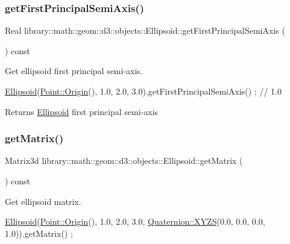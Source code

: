 \subsubsection{\texorpdfstring{get\+First\+Principal\+Semi\+Axis()}{getFirstPrincipalSemiAxis()}}
{\footnotesize\ttfamily Real library\+::math\+::geom\+::d3\+::objects\+::\+Ellipsoid\+::get\+First\+Principal\+Semi\+Axis (\begin{DoxyParamCaption}{ }\end{DoxyParamCaption}) const}



Get ellipsoid first principal semi-\/axis. 


\begin{DoxyCode}
\hyperlink{classlibrary_1_1math_1_1geom_1_1d3_1_1objects_1_1_ellipsoid_aae81fe0edc7f0e8d4590ea89ae73cb14}{Ellipsoid}(\hyperlink{classlibrary_1_1math_1_1geom_1_1d3_1_1objects_1_1_point_ab2a38e285c562e50bf350272c083986f}{Point::Origin}(), 1.0, 2.0, 3.0).getFirstPrincipalSemiAxis() ; \textcolor{comment}{// 1.0}
\end{DoxyCode}


\begin{DoxyReturn}{Returns}
\hyperlink{classlibrary_1_1math_1_1geom_1_1d3_1_1objects_1_1_ellipsoid}{Ellipsoid} first principal semi-\/axis 
\end{DoxyReturn}
\mbox{\label{classlibrary_1_1math_1_1geom_1_1d3_1_1objects_1_1_ellipsoid_ae6af9f16762e8c38b0a71c306d29ddbf}} 
\subsubsection{\texorpdfstring{get\+Matrix()}{getMatrix()}}
{\footnotesize\ttfamily Matrix3d library\+::math\+::geom\+::d3\+::objects\+::\+Ellipsoid\+::get\+Matrix (\begin{DoxyParamCaption}{ }\end{DoxyParamCaption}) const}



Get ellipsoid matrix. 


\begin{DoxyCode}
\hyperlink{classlibrary_1_1math_1_1geom_1_1d3_1_1objects_1_1_ellipsoid_aae81fe0edc7f0e8d4590ea89ae73cb14}{Ellipsoid}(\hyperlink{classlibrary_1_1math_1_1geom_1_1d3_1_1objects_1_1_point_ab2a38e285c562e50bf350272c083986f}{Point::Origin}(), 1.0, 2.0, 3.0, \hyperlink{classlibrary_1_1math_1_1geom_1_1d3_1_1trf_1_1rot_1_1_quaternion_a006294eb483bcfc352c2dc36cf19ceec}{Quaternion::XYZS}(0.0, 0.0, 
      0.0, 1.0)).getMatrix() ;
\end{DoxyCode}


